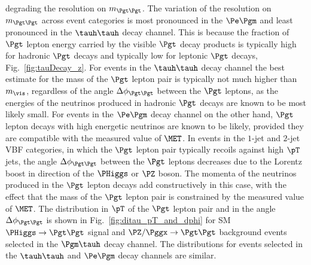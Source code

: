 degrading the resolution on $m_{\Pgt\Pgt}$.
The variation of the resolution on $m_{\Pgt\Pgt}$ across event categories is most pronounced in the $\Pe\Pgm$ and least pronounced in the $\tauh\tauh$ decay channel.
This is because the fraction of $\Pgt$ lepton energy carried by the visible $\Pgt$ decay products is typically high for hadronic $\Pgt$ decays and typically low for leptonic $\Pgt$ decays,
\cf Fig.~\ref{fig:tauDecay_z}.
For events in the $\tauh\tauh$ decay channel the best estimate for the mass of the $\Pgt$ lepton pair is typically not much higher than $m_{\vis}$,
regardless of the angle $\Delta\phi_{\Pgt\Pgt}$ between the $\Pgt$ leptons,
as the energies of the neutrinos produced in hadronic $\Pgt$ decays are known to be most likely small.
For events in the $\Pe\Pgm$ decay channel on the other hand,
$\Pgt$ lepton decays with high energetic neutrinos are known to be likely,
provided they are compatible with the measured value of $\MET$.
In events in the $1$-jet and $2$-jet VBF categories,
in which the $\Pgt$ lepton pair typically recoils against high $\pT$ jets,
the angle $\Delta\phi_{\Pgt\Pgt}$ between the $\Pgt$ leptons decreases due to the Lorentz boost in direction of the $\PHiggs$ or $\PZ$ boson.
The momenta of the neutrinos produced in the $\Pgt$ lepton decays add constructively in this case,
with the effect that the mass of the $\Pgt$ lepton pair is constrained by the measured value of $\MET$.
The distribution in $\pT$ of the $\Pgt$ lepton pair and in
the angle $\Delta\phi_{\Pgt\Pgt}$ is shown in Fig.~\ref{fig:ditau_pT_and_dphi}
for SM $\PHiggs \to \Pgt\Pgt$ signal and $\PZ/\Pggx \to \Pgt\Pgt$ background events selected in the $\Pgm\tauh$ decay
channel.
The distributions for events selected in the $\tauh\tauh$ and $\Pe\Pgm$ decay channels are similar.

